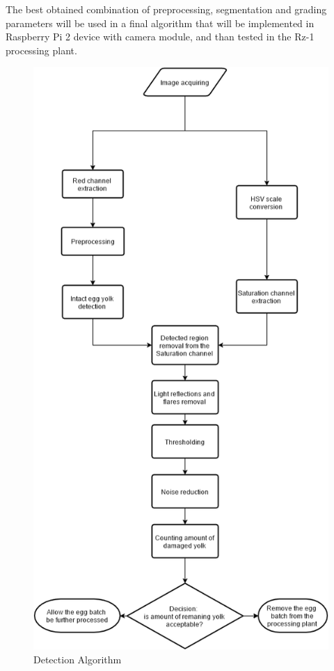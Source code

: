 \documentclass[12pt,twoside,a4paper]{article}
\begin{document}
The best obtained combination of preprocessing, segmentation and grading parameters will be used in a final algorithm that will be implemented in Raspberry Pi 2 device with camera module, and than tested in the Rz-1 processing plant.


\begin{figure}[H]
\centering
\includegraphics[width=0.5\paperwidth]{algorithmV}
\caption{Detection Algorithm}
\end{figure}
\end{document}
